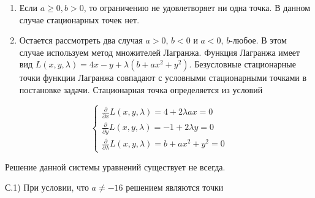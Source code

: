 \documentclass[addpoints, answers]{exam} %
\begin{document}
\begin{questions}
\begin{solution}
\begin{enumerate}
\item  Если $a\ge 0,b>0$, то ограничению не удовлетворяет ни одна точка. В данном случае стационарных точек нет.

\item  Остается рассмотреть два случая $a>0$, $b<0$ и $a<0$, $b$-любое. В этом случае используем метод множителей Лагранжа. Функция Лагранжа имеет вид $L\left(x,y,\lambda \right)=4x-y+\lambda \left(b+ax^{2} +y^{2} \right)$. Безусловные стационарные точки функции Лагранжа совпадают с условными стационарными точками в постановке задачи. Стационарная точка определяется из условий
\end{enumerate}

\[
\left\{\begin{array}{c} {\frac{\partial }{\partial x} L\left(x,y,\lambda \right)=4+2\lambda ax=0} \\ {\frac{\partial }{\partial y} L\left(x,y,\lambda \right)=-1+2\lambda y=0} \\ {\frac{\partial }{\partial \lambda } L\left(x,y,\lambda \right)=b+ax^{2} +y^{2} =0} \end{array}\right.
\]

Решение данной системы уравнений существует не всегда.

С.1) При условии, что $a\ne -16$ решением являются точки


\end{solution}
\end{questions}
\end{document}
